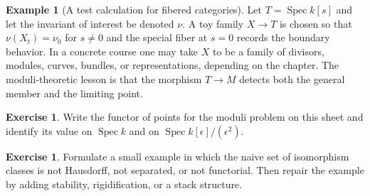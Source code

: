 \documentclass[11pt]{amsart}
\theoremstyle{definition}
\newtheorem{example}[theorem]{Example}
\newtheorem{exercise}[theorem]{Exercise}
\newcommand{\Spec}{\operatorname{Spec}}
\begin{document}
\begin{example}[A test calculation for fibered categories]
Let $T=\Spec k[s]$ and let the invariant of interest be denoted $\nu$.  A toy family $X\to T$ is chosen so that $\nu(X_t)=\nu_0$ for $s\ne0$ and the special fiber at $s=0$ records the boundary behavior.  In a concrete course one may take $X$ to be a family of divisors, modules, curves, bundles, or representations, depending on the chapter.  The moduli-theoretic lesson is that the morphism $T\to M$ detects both the general member and the limiting point.
\end{example}
\begin{exercise}
Write the functor of points for the moduli problem on this sheet and identify its value on $\Spec k$ and on $\Spec k[\epsilon]/(\epsilon^2)$.
\end{exercise}
\begin{exercise}
Formulate a small example in which the naive set of isomorphism classes is not Hausdorff, not separated, or not functorial.  Then repair the example by adding stability, rigidification, or a stack structure.
\end{exercise}
\clearpage
\end{document}
